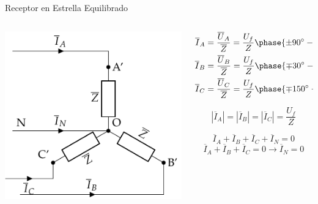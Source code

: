 \documentclass[aspectratio=169, usenames,svgnames,dvipsnames]{beamer}
\begin{document}
\begin{frame}[label={sec:org5b6c941}]{Receptor en Estrella Equilibrado}
\begin{columns}
\begin{column}{0.5\columnwidth}
\begin{center}
\includegraphics[width=.9\linewidth]{../figs/EstrellaEquilibrado_Receptor.pdf}
\end{center}
\end{column}

\begin{column}{0.5\columnwidth}
\begin{align*}
  \overline{I}_A &= \frac{\overline{U}_A}{\overline{Z}} = \frac{U_f}{Z}\phase{\ang{\pm 90} - \theta} \\
  \overline{I}_B &= \frac{\overline{U}_B}{\overline{Z}} = \frac{U_f}{Z}\phase{\ang{\mp 30} - \theta}\\
  \overline{I}_C &= \frac{\overline{U}_C}{\overline{Z}} = \frac{U_f}{Z}\phase{\ang{\mp 150} - \theta}
\end{align*}


\[
  \boxed{|\overline{I}_A| = |\overline{I}_B| = |\overline{I}_C| = \frac{U_f}{Z}}
\]

\[
  \overline{I}_A  + \overline{I}_B + \overline{I}_C + \overline{I}_N = 0
\]
\[
   \overline{I}_A  + \overline{I}_B + \overline{I}_C  = 0 \rightarrow \boxed{\overline{I}_N = 0}
\]
\end{column}
\end{columns}
\end{frame}
\end{document}
